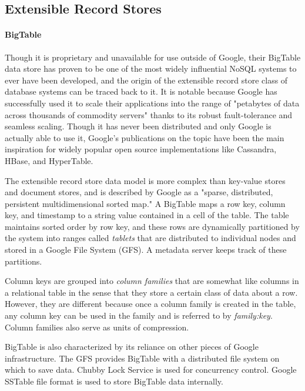 \documentclass[11pt,a4paper]{report}
\begin{document}
\subsection{Extensible Record Stores}
\paragraph{BigTable}
Though it is proprietary and unavailable for use outside of Google, their BigTable data store has proven to be one of the most widely influential NoSQL systems to ever have been developed, and the origin of the extensible record store class of database systems can be traced back to it.\cite{khetrapal2006hbase}  It is notable because Google has successfully used it to scale their applications into the range of "petabytes of data across thousands of commodity servers" thanks to its robust fault-tolerance and seamless scaling.\cite{chang2008bigtable} Though it has never been distributed and only Google is actually able to use it, Google's publications on the topic have been the main inspiration for widely popular open source implementations like Cassandra, HBase, and HyperTable.\cite{lakshman2010cassandra,taylor2010overview,khetrapal2006hbase}

The extensible record store data model is more complex than key-value stores and document stores, and is described by Google as a "sparse, distributed, persistent multidimensional sorted map."\cite{chang2008bigtable} A BigTable maps a row key, column key, and timestamp to a string value contained in a cell of the table. The table maintains sorted order by row key, and these rows are dynamically partitioned by the system into ranges called \textit{tablets} that are distributed to individual nodes and stored in a Google File System (GFS). A metadata server keeps track of these partitions.\cite{chang2008bigtable}

Column keys are grouped into \textit{column families} that are somewhat like columns in a relational table in the sense that they store a certain class of data about a row. However, they are different because once a column family is created in the table, any column key can be used in the family and is referred to by \textit{family:key}. Column families also serve as units of compression.\cite{chang2008bigtable}

BigTable is also characterized by its reliance on other pieces of Google infrastructure. The GFS provides BigTable with a distributed file system on which to save data. Chubby Lock Service is used for concurrency control. Google SSTable file format is used to store BigTable data internally.
\end{document}
